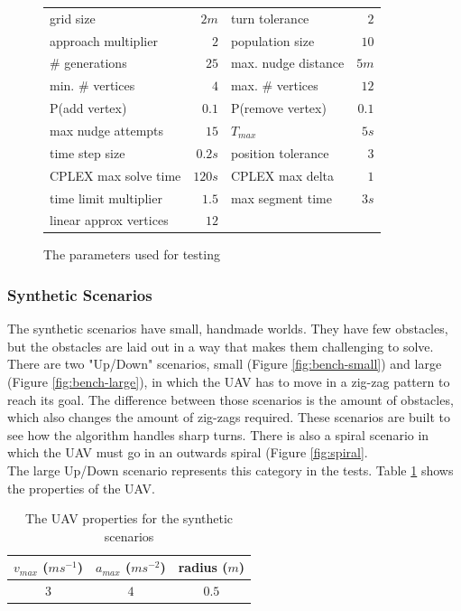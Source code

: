 \begin{figure}[h]
\centering
\begin{tabular}{ l  r | l r }
grid size 			& $2m$ 	& turn tolerance 		& $2$ \\
approach multiplier & $2$ 	& population size 		& $ 10$ \\
\# generations 		& $25$ 	& max. nudge distance 	& $5m$\\
min. \# vertices 	& $ 4$ 	& max. \# vertices 		& $12$ \\
P(add vertex) 		& $0.1$ & P(remove vertex) 		& $0.1$  \\
max nudge attempts 	& $15$ 	& $ T_{max}$ 			& $5s$ \\
time step size 		& $0.2s$& position tolerance & $3$ \\
CPLEX max solve time & $120s$ & CPLEX max delta & $1$ \\
time limit multiplier & $1.5$ & max segment time & $3s$\\
linear approx vertices & $12$ & & \\
\end{tabular}
\caption{The parameters used for testing}
\label{table:params}
\end{figure}
\clearpage
\subsubsection{Synthetic Scenarios}
\label{subsec:synth}
The synthetic scenarios have small, handmade worlds. They have few obstacles, but the obstacles are laid out in a way that makes them challenging to solve. There are two "Up/Down" scenarios, small (Figure \ref{fig:bench-small}) and large (Figure \ref{fig:bench-large}), in which the UAV has to move in a zig-zag pattern to reach its goal. The difference between those scenarios is the amount of obstacles, which also changes the amount of zig-zags required. These scenarios are built to see how the algorithm handles sharp turns. There is also a spiral scenario in which the UAV must go in an outwards spiral (Figure \ref{fig:spiral}.\\
The large Up/Down scenario represents this category in the tests. Table \ref{table:uav-synth} shows the properties of the UAV.

\begin{table}[h]
\centering
\begin{tabular}{ c | c | c }
$v_{max}$ ($ms^{-1}$)	& $a_{max}$ ($ms^{-2}$) 	& radius ($m$) 	 \\
\hline
$3$ & $4$ 	& $0.5$ \\
\end{tabular}
\caption{The UAV properties for the synthetic scenarios}
\label{table:uav-synth}
\end{table}

